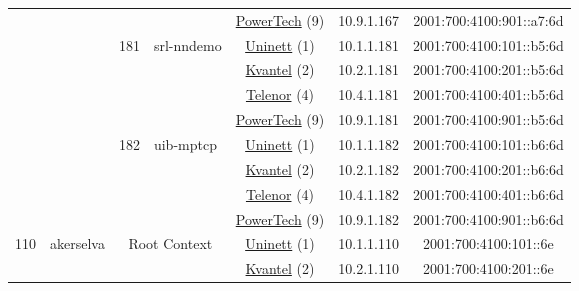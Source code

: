 \begin{small}
\begin{center}
\begin{longtable}{|c|c|c|c|c|c|c|c|}
  &  &  &  & \multicolumn{2}{|c|}{\tiny{\href{http://www.powertech.no}{PowerTech} (9)}} & \tiny{10.9.1.167} & \tiny{2001:700:4100:901::a7:6d} \\* \cline{3-3}\cline{4-4}\cline{5-5}\cline{6-6}\cline{7-7}\cline{8-8}
  &  & \multirow{4}{*}{\tiny{181}} & \multicolumn{1}{|l|}{\multirow{4}{*}{\tiny{srl-nndemo}}} & \multicolumn{2}{|c|}{\tiny{\href{https://www.uninett.no}{Uninett} (1)}} & \tiny{10.1.1.181} & \tiny{2001:700:4100:101::b5:6d} \\* \cline{5-5}\cline{6-6}\cline{7-7}\cline{8-8}
  &  &  &  & \multicolumn{2}{|c|}{\tiny{\href{http://kvantel.no}{Kvantel} (2)}} & \tiny{10.2.1.181} & \tiny{2001:700:4100:201::b5:6d} \\* \cline{5-5}\cline{6-6}\cline{7-7}\cline{8-8}
  &  &  &  & \multicolumn{2}{|c|}{\tiny{\href{https://www.telenor.no}{Telenor} (4)}} & \tiny{10.4.1.181} & \tiny{2001:700:4100:401::b5:6d} \\* \cline{5-5}\cline{6-6}\cline{7-7}\cline{8-8}
  &  &  &  & \multicolumn{2}{|c|}{\tiny{\href{http://www.powertech.no}{PowerTech} (9)}} & \tiny{10.9.1.181} & \tiny{2001:700:4100:901::b5:6d} \\* \cline{3-3}\cline{4-4}\cline{5-5}\cline{6-6}\cline{7-7}\cline{8-8}
  &  & \multirow{4}{*}{\tiny{182}} & \multicolumn{1}{|l|}{\multirow{4}{*}{\tiny{uib-mptcp}}} & \multicolumn{2}{|c|}{\tiny{\href{https://www.uninett.no}{Uninett} (1)}} & \tiny{10.1.1.182} & \tiny{2001:700:4100:101::b6:6d} \\* \cline{5-5}\cline{6-6}\cline{7-7}\cline{8-8}
  &  &  &  & \multicolumn{2}{|c|}{\tiny{\href{http://kvantel.no}{Kvantel} (2)}} & \tiny{10.2.1.182} & \tiny{2001:700:4100:201::b6:6d} \\* \cline{5-5}\cline{6-6}\cline{7-7}\cline{8-8}
  &  &  &  & \multicolumn{2}{|c|}{\tiny{\href{https://www.telenor.no}{Telenor} (4)}} & \tiny{10.4.1.182} & \tiny{2001:700:4100:401::b6:6d} \\* \cline{5-5}\cline{6-6}\cline{7-7}\cline{8-8}
  &  &  &  & \multicolumn{2}{|c|}{\tiny{\href{http://www.powertech.no}{PowerTech} (9)}} & \tiny{10.9.1.182} & \tiny{2001:700:4100:901::b6:6d} \\ \hline
 \multirow{32}{*}{\tiny{110}} & \multicolumn{1}{|l|}{\multirow{32}{*}{\tiny{akerselva}}} & \multicolumn{2}{|c|}{\multirow{4}{*}{\tiny{Root Context}}} & \multicolumn{2}{|c|}{\tiny{\href{https://www.uninett.no}{Uninett} (1)}} & \tiny{10.1.1.110} & \tiny{2001:700:4100:101::6e} \\* \cline{5-5}\cline{6-6}\cline{7-7}\cline{8-8}
  &  & \multicolumn{2}{|c|}{} & \multicolumn{2}{|c|}{\tiny{\href{http://kvantel.no}{Kvantel} (2)}} & \tiny{10.2.1.110} & \tiny{2001:700:4100:201::6e} \\* \cline{5-5}\cline{6-6}\cline{7-7}\cline{8-8}

\end{longtable}
\end{center}
\end{small}
